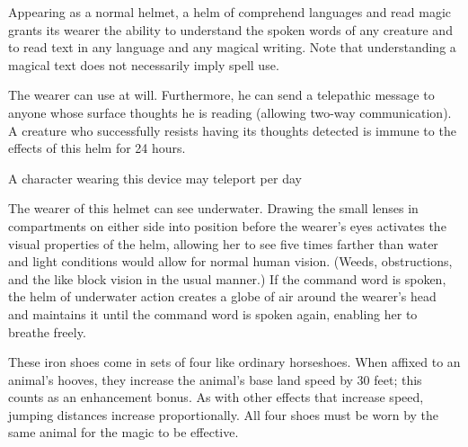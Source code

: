  Appearing as a normal helmet, a helm of comprehend languages and read magic grants its wearer the ability to understand the spoken words of any creature and to read text in any language and any magical writing. Note that understanding a magical text does not necessarily imply spell use.

 The wearer can use  at will. Furthermore, he can send a telepathic message to anyone whose surface thoughts he is reading (allowing two-way communication). A creature who successfully resists having its thoughts detected is immune to the effects of this helm for 24 hours.

 A character wearing this device may teleport  per day 

 The wearer of this helmet can see underwater. Drawing the small lenses in compartments on either side into position before the wearer's eyes  activates the visual properties of the helm, allowing her to see five times farther than water and light conditions would allow for normal human vision. (Weeds, obstructions, and the like block vision in the usual manner.) If the command word is spoken, the helm of underwater action creates a globe of air around the wearer's head and maintains it until the command word is spoken again, enabling her to breathe  freely. 

 These iron shoes come in sets of four like ordinary horseshoes. When affixed to an animal's hooves, they increase the animal's base land speed by 30 feet; this counts as an enhancement bonus. As with other effects that increase speed, jumping distances increase proportionally. All four shoes must be worn by the same animal for the magic to be effective.

